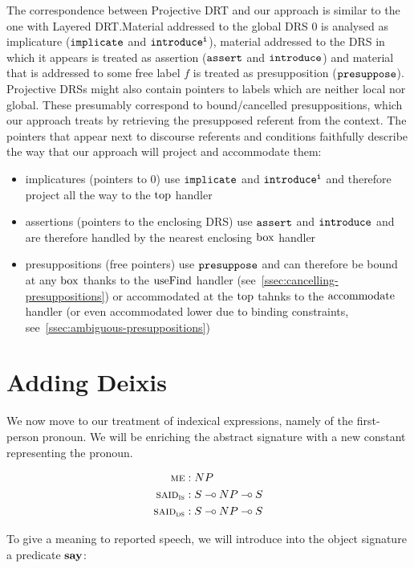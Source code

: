 The correspondence between Projective DRT and our approach is similar to
the one with Layered DRT.\@ Material addressed to the global DRS $0$ is
analysed as implicature ($\mathtt{implicate}$ and $\mathtt{introduce^i}$), material
addressed to the DRS in which it appears is treated as assertion
($\mathtt{assert}$ and $\mathtt{introduce}$) and material that is addressed to some
free label $f$ is treated as presupposition ($\mathtt{presuppose}$). Projective
DRSs might also contain pointers to labels which are neither local nor
global. These presumably correspond to bound/cancelled presuppositions,
which our approach treats by retrieving the presupposed referent from the
context. The pointers that appear next to discourse referents and
conditions faithfully describe the way that our approach will project and
accommodate them:

\begin{itemize}
\item implicatures (pointers to $0$) use $\mathtt{implicate}$ and
  $\mathtt{introduce^i}$ and therefore project all the way to the $\mathrm{top}$
  handler
\item assertions (pointers to the enclosing DRS) use $\mathtt{assert}$ and
  $\mathtt{introduce}$ and are therefore handled by the nearest enclosing
  $\mathrm{box}$ handler
\item presuppositions (free pointers) use $\mathtt{presuppose}$ and can
  therefore be bound at any $\mathrm{box}$ thanks to the $\operatorname{useFind}$ handler
  (see~\ref{ssec:cancelling-presuppositions}) or accommodated at the $\mathrm{top}$
  tahnks to the $\operatorname{accommodate}$ handler (or even accommodated lower due to
  binding constraints, see~\ref{ssec:ambiguous-presuppositions})
\end{itemize}


\section{Adding Deixis}
\label{sec:adding-deixis}

We now move to our treatment of indexical expressions, namely of the
first-person pronoun. We will be enriching the abstract signature with a
new constant representing the pronoun.

\begin{align*}
  \textsc{me} &: NP \\
  \textsc{said}_{\textsc{is}} &: S \mathbin{{-}\mkern-3.5mu{\circ}} NP \mathbin{{-}\mkern-3.5mu{\circ}} S \\
  \textsc{said}_{\textsc{ds}} &: S \mathbin{{-}\mkern-3.5mu{\circ}} NP \mathbin{{-}\mkern-3.5mu{\circ}} S
\end{align*}

To give a meaning to reported speech, we will introduce into the object
signature a predicate $\textbf{say}$:

